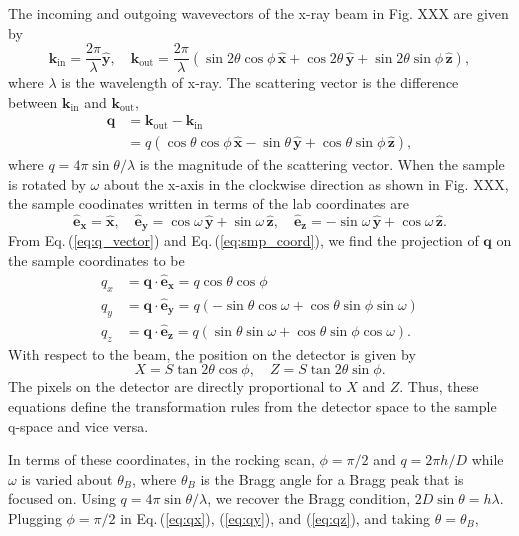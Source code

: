 \documentclass[12pt,letterpaper]{article}
\newcommand{\Eq}[1]{Eq.\,(\ref{#1})}%
\newcommand{\xhat}{\mathbf{\hat{x}}}
\newcommand{\yhat}{\mathbf{\hat{y}}}
\newcommand{\zhat}{\mathbf{\hat{z}}}
\newcommand{\kin}{\mathbf{k}_{\mathrm{in}}}
\newcommand{\kout}{\mathbf{k}_{\mathrm{out}}}
\begin{document}
The incoming and outgoing wavevectors of the x-ray beam in Fig. XXX 
are given by
\begin{equation}
  \kin = \frac{2\pi}{\lambda} \yhat, \quad
  \kout = 
    \frac{2\pi}{\lambda} \left( 
      \sin 2\theta \cos\phi \, \xhat
      + \cos 2\theta \, \yhat
      + \sin 2\theta \sin\phi \, \zhat 
    \right),
  \label{eq:kinkout}
\end{equation}
where $\lambda$ is the wavelength of x-ray. The scattering vector is
the difference between $\kin$ and $\kout$,
\begin{align}
  \mathbf{q} &= \kout - \kin \nonumber \\
             &= q \left( 
                  \cos\theta\cos\phi \, \xhat - \sin\theta \, \yhat
                  + \cos\theta\sin\phi \, \zhat
                \right),
  \label{eq:q_vector}
\end{align}
where $q=4\pi\sin\theta/\lambda$ is the magnitude of the scattering vector. 
When the sample is rotated by $\omega$ about the x-axis in the clockwise 
direction as shown in Fig. XXX, the sample coodinates written in terms of 
the lab coordinates are  
\begin{equation}
  \mathbf{\hat{e}_x} = \xhat, \quad
  \mathbf{\hat{e}_y} = \cos\omega\,\yhat + \sin\omega\,\zhat, \quad
  \mathbf{\hat{e}_z} = -\sin\omega\,\yhat + \cos\omega\,\zhat.
  \label{eq:smp_coord}
\end{equation}
From \Eq{eq:q_vector} and \Eq{eq:smp_coord}, we find the projection of 
$\mathbf{q}$ on the sample coordinates to be
\begin{align}
  q_x &= \mathbf{q}\cdot\mathbf{\hat{e}_x} 
       = q\cos\theta\cos\phi 
       \label{eq:qx} \\
  q_y &= \mathbf{q}\cdot\mathbf{\hat{e}_y} 
       = q\left(-\sin\theta\cos\omega + \cos\theta\sin\phi\sin\omega\right) 
       \label{eq:qy} \\
  q_z &= \mathbf{q}\cdot\mathbf{\hat{e}_z} 
       = q\left(\sin\theta\sin\omega + \cos\theta\sin\phi\cos\omega\right).
       \label{eq:qz}
\end{align}
With respect to the beam, the position on the detector is given by
\begin{equation}
  X = S \tan 2\theta \cos\phi, \quad Z = S \tan 2\theta \sin\phi.
\end{equation} 
The pixels on the detector are directly proportional to $X$ and $Z$. Thus,
these equations define the transformation rules from the detector space
to the sample q-space and vice versa.

In terms of these coordinates, in the rocking scan, $\phi=\pi/2$ and 
$q=2\pi h/D$
while $\omega$ is varied about $\theta_B$, where $\theta_B$ is the Bragg
angle for a Bragg peak that is focused on. Using $q=4\pi\sin\theta/\lambda$, 
we recover the Bragg condition, $2D\sin\theta=h\lambda$. Plugging $\phi=\pi/2$
in Eq.\,(\ref{eq:qx}), (\ref{eq:qy}), and (\ref{eq:qz}), and taking 
$\theta=\theta_B$, 
\end{document}
